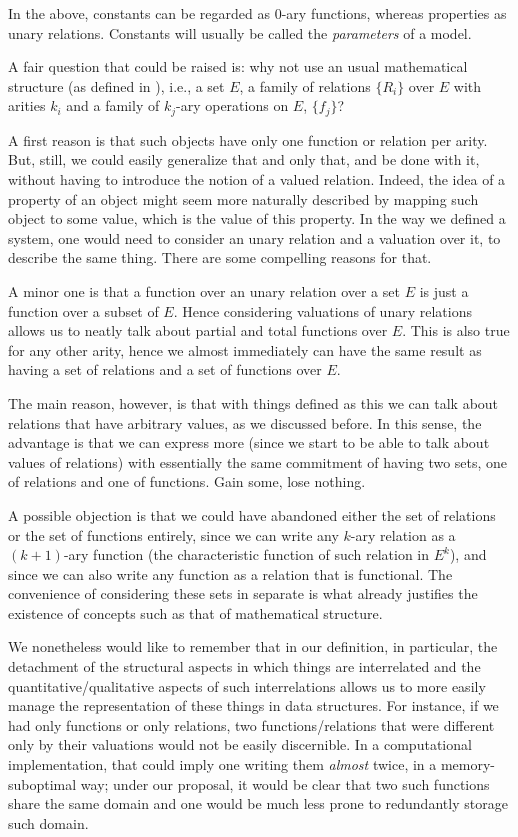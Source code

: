 In the above, constants can be regarded as $0$-ary functions, whereas properties as unary relations. Constants will usually be called the \textit{parameters} of a model. 

A fair question that could be raised is: why not use an usual mathematical structure (as defined in \cite{Poizat2000}), i.e., a set $E$, a family of relations $\{R_i\}$ over $E$ with arities $k_i$ and a family of $k_j$-ary operations on $E$, $\{f_j\}$? 

A first reason is that such objects have only one function or relation per arity. But, still, we could easily generalize that and only that, and be done with it, without having to introduce the notion of a valued relation. Indeed, the idea of a property of an object might seem more naturally described by mapping such object to some value, which is the value of this property. In the way we defined a system, one would need to consider an unary relation and a valuation over it, to describe the same thing. There are some compelling reasons for that. 

A minor one is that a function over an unary relation over a set $E$ is just a function over a subset of $E$. Hence considering valuations of unary relations allows us to neatly talk about partial and total functions over $E$. This is also true for any other arity, hence we almost immediately can have the same result as having a set of relations and a set of functions over $E$. 

The main reason, however, is that with things defined as this we can talk about relations that have arbitrary values, as we discussed before. In this sense, the advantage is that we can express more (since we start to be able to talk about values of relations) with essentially the same commitment of having two sets, one of relations and one of functions. Gain some, lose nothing. 

A possible objection is that we could have abandoned either the set of relations or the set of functions entirely, since we can write any $k$-ary relation as a $(k+1)$-ary function (the characteristic function of such relation in $E^k$), and since we can also write any function as a relation that is functional. The convenience of considering these sets in separate is what already justifies the existence of concepts such as that of mathematical structure. 

We nonetheless would like to remember that in our definition, in particular, the detachment of the structural aspects in which things are interrelated and the quantitative/qualitative aspects of such interrelations allows us to more easily manage the representation of these things in data structures. For instance, if we had only functions or only relations, two functions/relations that were different only by their valuations would not be easily discernible. In a computational implementation, that could imply one writing them \textit{almost} twice, in a memory-suboptimal way; under our proposal, it would be clear that two such functions share the same domain and one would be much less prone to redundantly storage such domain.

